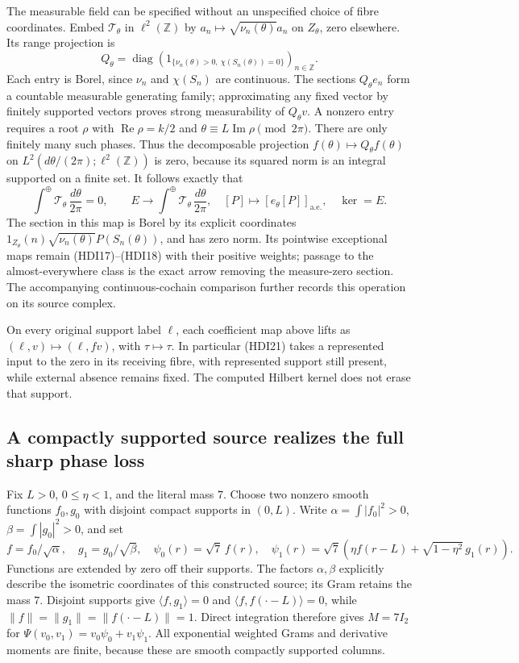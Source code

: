 The measurable field can be specified without an unspecified
choice of fibre coordinates. Embed \(\mathcal T_\theta\) in
\(\ell^2(\mathbb Z)\) by \(a_n\mapsto\sqrt{\nu_n(\theta)}a_n\)
on \(Z_\theta\), zero elsewhere. Its range projection is
\[
 Q_\theta=\operatorname{diag}\!
 \left(1_{\{\nu_n(\theta)>0,\ \chi(S_n(\theta))=0\}}\right)_{n\in\mathbb Z}.
 \tag{HDI20}
\]
Each entry is Borel, since \(\nu_n\) and \(\chi(S_n)\) are
continuous. The sections \(Q_\theta e_n\) form a countable
measurable generating family; approximating any fixed vector
by finitely supported vectors proves strong measurability of
\(Q_\theta v\). A nonzero entry requires a root \(\rho\) with
\(\operatorname{Re}\rho=k/2\) and
\(\theta\equiv L\operatorname{Im}\rho\pmod{2\pi}\).
There are only finitely many such phases. Thus the decomposable
projection \(f(\theta)\mapsto Q_\theta f(\theta)\) on
\(L^2(d\theta/(2\pi);\ell^2(\mathbb Z))\) is zero, because its
squared norm is an integral supported on a finite set.
It follows exactly that
\[
 \int^\oplus\mathcal T_\theta\,\frac{d\theta}{2\pi}=0,\qquad
 E\longrightarrow\int^\oplus\mathcal T_\theta\,\frac{d\theta}{2\pi},
 \quad[P]\mapsto[e_\theta[P]]_{\mathrm{a.e.}},
 \quad\ker=E.
 \tag{HDI21}
\]
The section in this map is Borel by its explicit coordinates
\(1_{Z_\theta}(n)\sqrt{\nu_n(\theta)}P(S_n(\theta))\), and has
zero norm. Its pointwise exceptional maps remain (HDI17)--(HDI18)
with their positive weights; passage to the almost-everywhere
class is the exact arrow removing the measure-zero section.
The accompanying continuous-cochain comparison further records
this operation on its source complex.

On every original support label \(\ell\), each coefficient map
above lifts as \((\ell,v)\mapsto(\ell,fv)\), with
\(\tau\mapsto\tau\). In particular (HDI21) takes a represented
input to the zero in its receiving fibre, with represented
support still present, while external absence remains fixed.
The computed Hilbert kernel does not erase that support.

\subsection{A compactly supported source realizes the full sharp phase loss}
Fix \(L>0\), \(0\le\eta<1\), and the literal mass \(7\).
Choose two nonzero smooth functions \(f_0,g_0\) with disjoint
compact supports in \((0,L)\). Write
\(\alpha=\int|f_0|^2>0\), \(\beta=\int|g_0|^2>0\), and set
\[
 f=f_0/\sqrt\alpha,\quad g_1=g_0/\sqrt\beta,\quad
 \psi_0(r)=\sqrt7\,f(r),\quad
 \psi_1(r)=\sqrt7\left(\eta f(r-L)+\sqrt{1-\eta^2}\,g_1(r)\right).
 \tag{HDI22}
\]
Functions are extended by zero off their supports. The factors
\(\alpha,\beta\) explicitly describe the isometric coordinates
of this constructed source; its Gram retains the mass \(7\).
Disjoint supports give \(\langle f,g_1\rangle=0\) and
\(\langle f,f(\cdot-L)\rangle=0\), while
\(\|f\|=\|g_1\|=\|f(\cdot-L)\|=1\).
Direct integration therefore gives \(M=7I_2\) for
\(\Psi(v_0,v_1)=v_0\psi_0+v_1\psi_1\).
All exponential weighted Grams and derivative moments are
finite, because these are smooth compactly supported columns.

